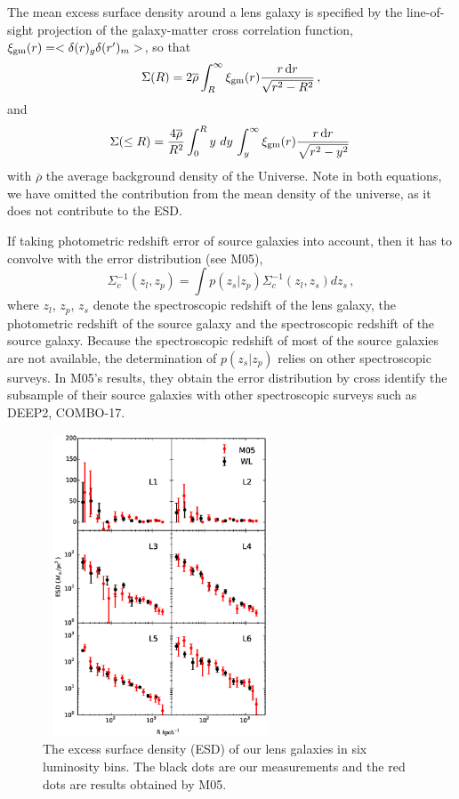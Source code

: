 \documentclass[apj]{emulateapj}
\newcommand{\rmd}{{\rm d}}
\begin{document}
The mean excess surface density around a lens galaxy is specified by
the line-of-sight projection of the galaxy-matter cross correlation
function, $\xi_{\rm gm}(r)=<\delta(r)_{g}\delta(r')_{m}>$, so that
%
\begin{equation}
\label{sigatr}
\Sigma(R) = 2 \overline{\rho} \int_{R}^{\infty} \xi_{\rm gm}(r) 
{r \, \rmd r \over \sqrt{r^2 - R^2}}\,,
\end{equation}
%
and
%
\begin{equation}
\label{siginr}
\Sigma(\leq R) = \frac{4\overline{\rho}}{R^2} \int_0^R y\,\,dy\,
 \int_{y}^{\infty} \xi_{\rm gm}(r) {r \, \rmd r \over \sqrt{r^2 - y^2}}\,
\end{equation}
%
with $\overline{\rho}$ the average background density of the Universe.  Note
in both equations, we have omitted the contribution from the mean density of
the universe, as it does not contribute to the ESD.  


If taking photometric redshift error of source galaxies into account,
then it has to convolve with the error distribution (see M05),
\begin{equation}
\Sigma_c^{-1}(z_l,z_p)=\int p(z_s|z_p)\Sigma_c^{-1}(z_l,z_s)dz_s\,,
\end{equation}
where $z_l$, $z_p$, $z_s$ denote the spectroscopic redshift of the
lens galaxy, the photometric redshift of the source galaxy and the
spectroscopic redshift of the source galaxy. Because the spectroscopic
redshift of most of the source galaxies are not available, the
determination of $p(z_s|z_p)$ relies on other spectroscopic
surveys. In M05's results, they obtain the error
distribution by cross identify the subsample of their source galaxies
with other spectroscopic surveys such as DEEP2, COMBO-17.

\begin{figure}
\centering
\includegraphics[width=7cm,height=9cm]{f5.eps}
\caption{The excess surface density (ESD) of our lens galaxies in six
  luminosity bins. The black dots are our measurements and the red
  dots are results obtained by M05.}
  \label{fig:compare_L}
\end{figure}
\end{document}

